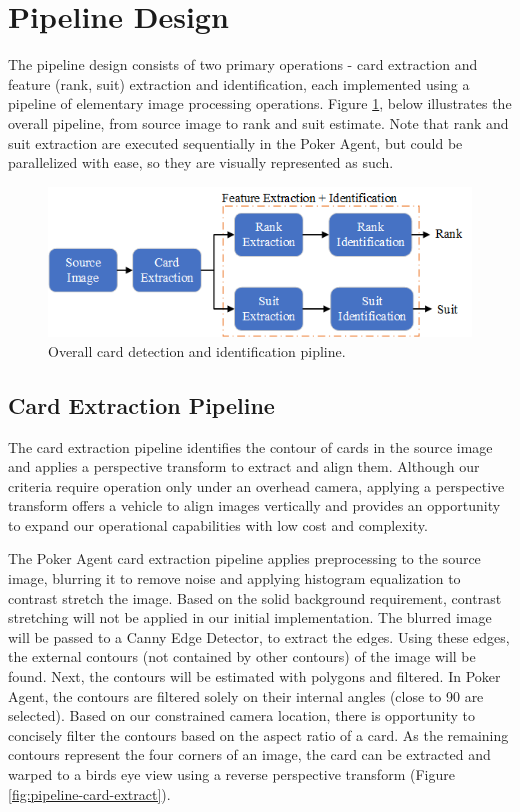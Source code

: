 \documentclass[conference]{IEEEtran}
\begin{document}
\section{Pipeline Design}
The pipeline design consists of two primary operations - card extraction and feature (rank, suit)
extraction and identification, each implemented using a pipeline of elementary image processing
operations. Figure \ref{fig:pipeline}, below illustrates the overall pipeline, from source image to
rank and suit estimate. Note that rank and suit extraction are executed sequentially in the Poker
Agent, but could be parallelized with ease, so they are visually represented as such.

\begin{figure}[htbp]
\centerline{\includegraphics[width=\columnwidth]{OverallPipeline.png}}
\caption{Overall card detection and identification pipline.}
\label{fig:pipeline}
\end{figure}

\subsection{Card Extraction Pipeline}

The card extraction pipeline identifies the contour of cards in the source image and applies a
perspective transform to extract and align them. Although our criteria require operation only under
an overhead camera, applying a perspective transform offers a vehicle to align images vertically and
provides an opportunity to expand our operational capabilities with low cost and complexity.

The Poker Agent card extraction pipeline applies preprocessing to the source image, blurring it to
remove noise and applying histogram equalization to contrast stretch the image. Based on the solid
background requirement, contrast stretching will not be applied in our initial implementation. The
blurred image will be passed to a Canny Edge Detector, to extract the edges. Using these edges, the
external contours (not contained by other contours) of the image will be found. Next, the contours
will be estimated with polygons and filtered. In Poker Agent, the contours are filtered solely on
their internal angles (close to 90 are selected). Based on our constrained camera location, there is
opportunity to concisely filter the contours based on the aspect ratio of a card. As the remaining
contours represent the four corners of an image, the card can be extracted and warped to a birds eye
view using a reverse perspective transform (Figure \ref{fig:pipeline-card-extract}).
\end{document}
